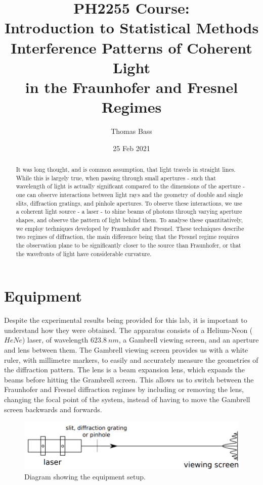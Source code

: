 \documentclass[a4paper]{article}
\title{PH2255 Course:\\
Introduction to Statistical Methods\\
Interference Patterns of Coherent Light\\in the Fraunhofer and Fresnel Regimes}
\author{Thomas Bass}
\date{25 Feb 2021}
\begin{document}
\maketitle

\begin{abstract}
It was long thought, and is common assumption, that light travels in straight lines. While this is largely true, when passing through small apertures - such that wavelength of light is actually significant compared to the dimensions of the aperture - one can observe interactions between light rays and the geometry of double and single slits, diffraction gratings, and pinhole apertures. To observe these interactions, we use a coherent light source - a laser - to shine beams of photons through varying aperture shapes, and observe the pattern of light behind them. To analyse these quantitatively, we employ techniques developed by Fraunhofer and Fresnel. These techniques describe two regimes of diffraction, the main difference being that the Fresnel regime requires the observation plane to be significantly closer to the source than Fraunhofer, or that the wavefronts of light have considerable curvature.
\end{abstract}
\section{Equipment}

Despite the experimental results being provided for this lab, it is important to understand how they were obtained. The apparatus consists of a Helium-Neon ($HeNe$) laser, of wavelength $623.8\ nm$, a Gambrell viewing screen, and an aperture and lens between them. The Gambrell viewing screen provides us with a white ruler, with millimetre markers, to easily and accurately measure the geometries of the diffraction pattern. The lens is a beam expansion lens, which expands the beams before hitting the Grambrell screen. This allows us to switch between the Fraunhofer and Fresnel diffraction regimes by including or removing the lens, changing the focal point of the system, instead of having to move the Gambrell screen backwards and forwards. 

\begin{figure}[h!]
\centerline{\includegraphics[scale=0.3]{setup.png}}%
\caption{Diagram showing the equipment setup.}
\label{fig:setup}
\end{figure}
\end{document}
